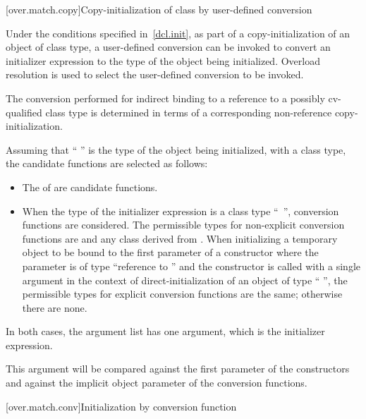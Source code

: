 [over.match.copy]{Copy-initialization of class by user-defined conversion}%

\pnum
Under the conditions specified in~\ref{dcl.init}, as
part of a copy-initialization of an object of class type, a user-defined
conversion can be invoked to convert an initializer expression to the
type of the object being initialized.
Overload resolution is used
to select the user-defined conversion to be invoked.
\begin{note}
The conversion performed for indirect binding to a reference to a possibly
cv-qualified class type is determined in terms of a corresponding non-reference
copy-initialization.
\end{note}
Assuming that
`` '' is the type of the object being initialized, with
a class type,
the candidate functions are selected as follows:
\begin{itemize}
\item
The  of
are candidate functions.
\item
When the type of the initializer expression is a class type
``\cv{}~'',
conversion functions are considered.
The permissible types for non-explicit conversion functions are
 and any class derived from .
When initializing a temporary object
to be bound to the first parameter of a constructor
where the parameter is of type
``reference to  ''
and the constructor is
called with a single argument in the context of
direct-initialization of an object of type `` '',
the permissible types for explicit conversion functions are the same;
otherwise there are none.
\end{itemize}

\pnum
In both cases, the argument list has one argument, which is the initializer
expression.
\begin{note}
This argument will be compared against
the first parameter of the constructors and against the implicit
object parameter of the conversion functions.
\end{note}

[over.match.conv]{Initialization by conversion function}%

